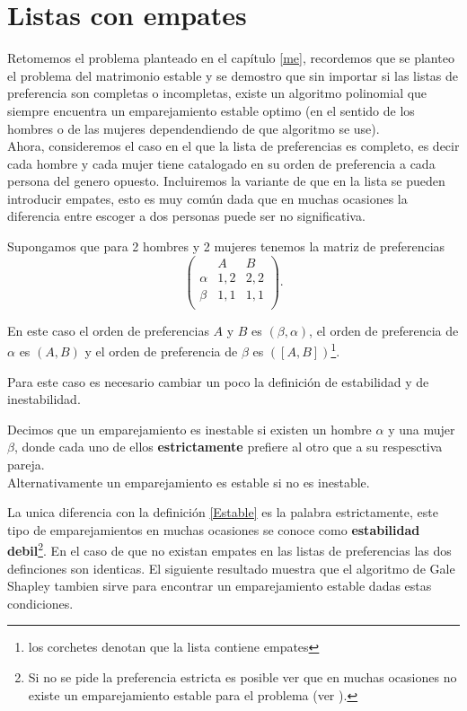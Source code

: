 \chapter{Listas con empates}

Retomemos el problema planteado en el capítulo \ref{me}, recordemos que se planteo el problema del matrimonio estable y se demostro que sin importar si las listas de preferencia son completas o incompletas, existe un algoritmo polinomial que siempre encuentra un emparejamiento estable optimo (en el sentido de los hombres o de las mujeres dependendiendo de que algoritmo se use). \\

Ahora, consideremos el caso en el que la lista de preferencias es completo, es decir cada hombre y cada mujer tiene catalogado en su orden de preferencia a cada persona del genero opuesto. Incluiremos la variante de que en la lista se pueden introducir empates, esto es muy común dada que en muchas ocasiones la diferencia entre escoger a dos personas puede ser no significativa. 

\begin{eje}{\cite{Verde}}
\label{ejemplo empates}
Supongamos que para 2 hombres y 2 mujeres tenemos la matriz de preferencias 
$$\begin{pmatrix}
& A & B  \\
\alpha & 1,2 & 2,2 \\
\beta & 1,1 & 1,1\\
\end{pmatrix}.$$

En este caso el orden de preferencias $A$ y $B$ es $(\beta, \alpha)$, el orden de preferencia de $\alpha$ es $(A,B)$ y el orden de preferencia de $\beta$ es $([A,B])$\footnote{los corchetes denotan que la lista contiene empates}.
\end{eje}

Para este caso es necesario cambiar un poco la definición de estabilidad y de inestabilidad. 

\begin{dfn}{\cite{Verde}}
\label{estricto}
Decimos que un emparejamiento es inestable si existen un hombre $\alpha$ y una mujer $\beta$, donde cada uno de ellos \textbf{estrictamente} prefiere al otro que a su respesctiva pareja.  \\
Alternativamente un emparejamiento es estable si no es inestable.
\end{dfn}

La unica diferencia con la definición \ref{Estable} es la palabra estrictamente, este tipo de emparejamientos en muchas ocasiones se conoce como \textbf{estabilidad debil}\footnote{Si no se pide la preferencia estricta es posible ver que en muchas ocasiones no existe un emparejamiento estable para el problema (ver \cite{Verde}).}. En el caso de que no existan empates en las listas de preferencias las dos definciones son identicas. El siguiente resultado muestra que el algoritmo de Gale Shapley tambien sirve para encontrar un emparejamiento estable dadas estas condiciones.


